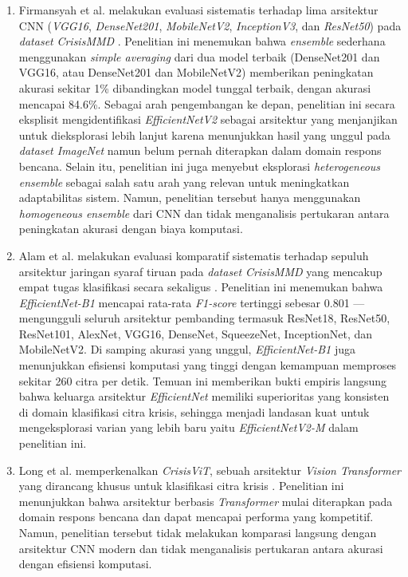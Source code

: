 \begin{enumerate}[noitemsep]
    \item Firmansyah et al. melakukan evaluasi sistematis terhadap lima
    arsitektur CNN (\textit{VGG16}, \textit{DenseNet201},
    \textit{MobileNetV2}, \textit{InceptionV3}, dan \textit{ResNet50})
    pada \textit{dataset} \textit{CrisisMMD}
    \cite{firmansyah2022ensemble}. Penelitian ini menemukan bahwa
    \textit{ensemble} sederhana menggunakan \textit{simple averaging}
    dari dua model terbaik (DenseNet201 dan VGG16, atau DenseNet201 dan
    MobileNetV2) memberikan peningkatan akurasi sekitar 1\%
    dibandingkan model tunggal terbaik, dengan akurasi mencapai 84.6\%.
    Sebagai arah pengembangan ke depan, penelitian ini secara eksplisit
    mengidentifikasi \textit{EfficientNetV2} sebagai arsitektur yang
    menjanjikan untuk dieksplorasi lebih lanjut karena menunjukkan
    hasil yang unggul pada \textit{dataset ImageNet} namun belum pernah
    diterapkan dalam domain respons bencana. Selain itu, penelitian ini
    juga menyebut eksplorasi \textit{heterogeneous ensemble} sebagai
    salah satu arah yang relevan untuk meningkatkan adaptabilitas
    sistem. Namun, penelitian tersebut hanya menggunakan
    \textit{homogeneous ensemble} dari CNN dan tidak menganalisis
    pertukaran antara peningkatan akurasi dengan biaya komputasi.

    \item Alam et al. melakukan evaluasi komparatif sistematis terhadap
    sepuluh arsitektur jaringan syaraf tiruan pada \textit{dataset}
    \textit{CrisisMMD} yang mencakup empat tugas klasifikasi secara
    sekaligus \cite{ofli2020benchmarks}. Penelitian ini menemukan bahwa
    \textit{EfficientNet-B1} mencapai rata-rata \textit{F1-score}
    tertinggi sebesar 0.801 — mengungguli seluruh arsitektur pembanding
    termasuk ResNet18, ResNet50, ResNet101, AlexNet, VGG16, DenseNet,
    SqueezeNet, InceptionNet, dan MobileNetV2. Di samping akurasi yang
    unggul, \textit{EfficientNet-B1} juga menunjukkan efisiensi
    komputasi yang tinggi dengan kemampuan memproses sekitar 260 citra
    per detik. Temuan ini memberikan bukti empiris langsung bahwa
    keluarga arsitektur \textit{EfficientNet} memiliki superioritas
    yang konsisten di domain klasifikasi citra krisis, sehingga menjadi
    landasan kuat untuk mengeksplorasi varian yang lebih baru yaitu
    \textit{EfficientNetV2-M} dalam penelitian ini.

    \item Long et al. memperkenalkan \textit{CrisisViT}, sebuah
    arsitektur \textit{Vision Transformer} yang dirancang khusus untuk
    klasifikasi citra krisis \cite{long2023crisisvit}. Penelitian ini
    menunjukkan bahwa arsitektur berbasis \textit{Transformer} mulai
    diterapkan pada domain respons bencana dan dapat mencapai performa
    yang kompetitif. Namun, penelitian tersebut tidak melakukan
    komparasi langsung dengan arsitektur CNN modern dan tidak
    menganalisis pertukaran antara akurasi dengan efisiensi komputasi.


\end{enumerate}
